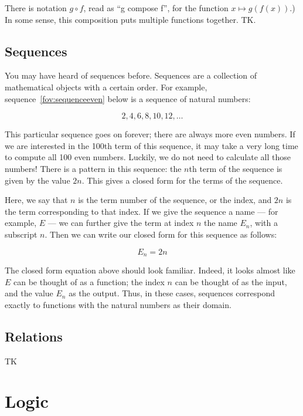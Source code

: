 \documentclass[a4paper,10pt]{report}
\begin{document}
There is notation \(g \circ f\), read as ``g compose f'', for the function \(x \mapsto
g(f(x))\).) In some sense, this composition puts multiple functions together. TK.

\section{Sequences}

You may have heard of sequences before. Sequences are a collection of mathematical objects
with a certain order. For example, sequence~\ref{fov:sequenceeven} below is a sequence of
natural numbers:

\begin{equation}
  2, 4, 6, 8, 10, 12, \dots
  \label{fov:sequenceeven}
\end{equation}

This particular sequence goes on forever; there are always more even numbers. If we are
interested in the 100th term of this sequence, it may take a very long time to compute all
100 even numbers. Luckily, we do not need to calculate all those numbers! There is a pattern
in this sequence: the \(n\)th term of the sequence is given by the value \(2n\). This gives
a closed form for the terms of the sequence.

Here, we say that \(n\) is the term number of the sequence, or the index, and \(2n\) is the
term corresponding to that index. If we give the sequence a name --- for example, \(E\) ---
we can further give the term at index \(n\) the name \(E_n\), with a subscript \(n\). Then
we can write our closed form for this sequence as follows:

\begin{equation*}
  E_n = 2n
\end{equation*}

The closed form equation above should look familiar. Indeed, it looks almost like \(E\) can
be thought of as a function; the index \(n\) can be thought of as the input, and the value
\(E_n\) as the output. Thus, in these cases, sequences correspond exactly to functions with
the natural numbers as their domain.

\section{Relations}

TK

\chapter{Logic}
\end{document}

